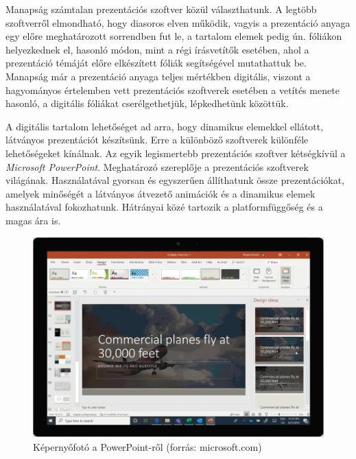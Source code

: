 

Manapság számtalan prezentációs szoftver közül választhatunk. A legtöbb szoftverről elmondható, hogy diasoros elven működik, vagyis a prezentáció anyaga egy előre meghatározott sorrendben fut le, a tartalom elemek pedig ún. fóliákon helyezkednek el, hasonló módon, mint a régi írásvetítők esetében, ahol a prezentáció témáját előre elkészített fóliák segítségével mutathattuk be. Manapság már a prezentáció anyaga teljes mértékben digitális, viszont a hagyományos értelemben vett prezentációs szoftverek esetében a vetítés menete hasonló, a digitális fóliákat cserélgethetjük, lépkedhetünk közöttük.

A digitális tartalom lehetőséget ad arra, hogy dinamikus elemekkel ellátott, látványos prezentációt készítsünk. Erre a különböző szoftverek különféle lehetőségeket kínálnak.
Az egyik legismertebb prezentációs szoftver kétségkívül a \textit{Microsoft PowerPoint}. Meghatározó szereplője a prezentációs szoftverek világának. Használatával gyorsan és egyszerűen állíthatunk össze prezentációkat, amelyek minőségét a látványos átvezető animációk és a dinamikus elemek használatával fokozhatunk. Hátrányai közé tartozik a platformfüggőség és a magas ára is.

\begin{figure}[h]
\centering
\includegraphics[width=8.97truecm, height=6.17truecm]{images/PowerPoint.png}
\caption{Képernyőfotó a PowerPoint-ről (forrás: microsoft.com)}
\label{fig:ppt}
\end{figure}

